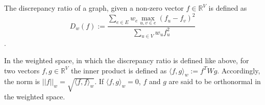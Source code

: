 The discrepancy ratio of a graph, given a non-zero vector $f \in \mathbb{R}^V$ is defined as $$D_w(f) := \frac{\sum_{e\in E} w_e \max_{u,v\in e}(f_u - f_v)^2}{\sum_{u\in V} w_u f_u^2}$$.

In the weighted space, in which the discrepancy ratio is defined like above, for two vectors $f, g \in \mathbb{R}^V$ the inner product is defined as $ \langle f,g \rangle_w := f^T W g$. Accordingly, the norm is $||f||_w = \sqrt{ \langle f,f \rangle_w}$.
If $ \langle f,g \rangle_w   = 0 $, $f$ and $g$ are said to be orthonormal in the weighted space.


